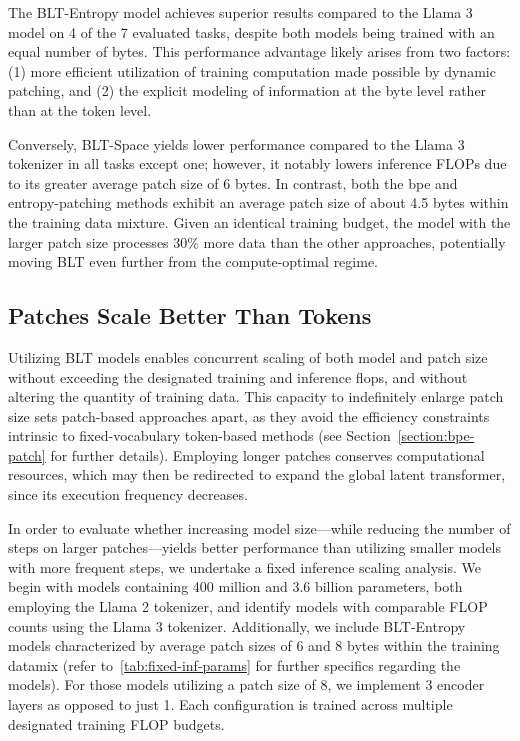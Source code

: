 The {\textsc BLT}-Entropy model achieves superior results compared to the Llama 3 model on 4 of the 7 evaluated tasks, despite both models being trained with an equal number of bytes. This performance advantage likely arises from two factors: (1) more efficient utilization of training computation made possible by dynamic patching, and (2) the explicit modeling of information at the byte level rather than at the token level.

Conversely, {\textsc BLT}-Space yields lower performance compared to the Llama 3 tokenizer in all tasks except one; however, it notably lowers inference FLOPs due to its greater average patch size of 6 bytes. In contrast, both the bpe and entropy-patching methods exhibit an average patch size of about 4.5 bytes within the training data mixture. Given an identical training budget, the model with the larger patch size processes 30\% more data than the other approaches, potentially moving {\textsc BLT} even further from the compute-optimal regime.

\subsection{Patches Scale Better Than Tokens} Utilizing {\textsc BLT} models enables concurrent scaling of both model and patch size without exceeding the designated training and inference flops, and without altering the quantity of training data. This capacity to indefinitely enlarge patch size sets patch-based approaches apart, as they avoid the efficiency constraints intrinsic to fixed-vocabulary token-based methods (see Section~\ref{section:bpe-patch} for further details). Employing longer patches conserves computational resources, which may then be redirected to expand the global latent transformer, since its execution frequency decreases.

In order to evaluate whether increasing model size—while reducing the number of steps on larger patches—yields better performance than utilizing smaller models with more frequent steps, we undertake a fixed inference scaling analysis. We begin with models containing 400 million and 3.6 billion parameters, both employing the Llama 2 tokenizer, and identify models with comparable FLOP counts using the Llama 3 tokenizer. Additionally, we include {\textsc BLT}-Entropy models characterized by average patch sizes of 6 and 8 bytes within the training datamix (refer to~\autoref{tab:fixed-inf-params} for further specifics regarding the models). For those models utilizing a patch size of 8, we implement 3 encoder layers as opposed to just 1. Each configuration is trained across multiple designated training FLOP budgets.

